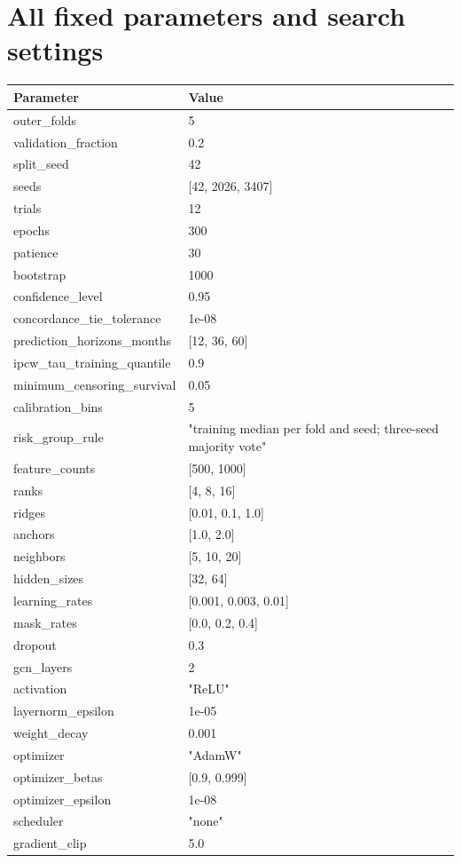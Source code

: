 \documentclass[10pt]{article}
\begin{document}
\section{All fixed parameters and search settings}
\begin{longtable}{p{}p{}}\hline Parameter & Value\\\hline
outer\_folds & 5\\
validation\_fraction & 0.2\\
split\_seed & 42\\
seeds & [42, 2026, 3407]\\
trials & 12\\
epochs & 300\\
patience & 30\\
bootstrap & 1000\\
confidence\_level & 0.95\\
concordance\_tie\_tolerance & 1e-08\\
prediction\_horizons\_months & [12, 36, 60]\\
ipcw\_tau\_training\_quantile & 0.9\\
minimum\_censoring\_survival & 0.05\\
calibration\_bins & 5\\
risk\_group\_rule & "training median per fold and seed; three-seed majority vote"\\
feature\_counts & [500, 1000]\\
ranks & [4, 8, 16]\\
ridges & [0.01, 0.1, 1.0]\\
anchors & [1.0, 2.0]\\
neighbors & [5, 10, 20]\\
hidden\_sizes & [32, 64]\\
learning\_rates & [0.001, 0.003, 0.01]\\
mask\_rates & [0.0, 0.2, 0.4]\\
dropout & 0.3\\
gcn\_layers & 2\\
activation & "ReLU"\\
layernorm\_epsilon & 1e-05\\
weight\_decay & 0.001\\
optimizer & "AdamW"\\
optimizer\_betas & [0.9, 0.999]\\
optimizer\_epsilon & 1e-08\\
scheduler & "none"\\
gradient\_clip & 5.0\\

\end{longtable}
\end{document}
